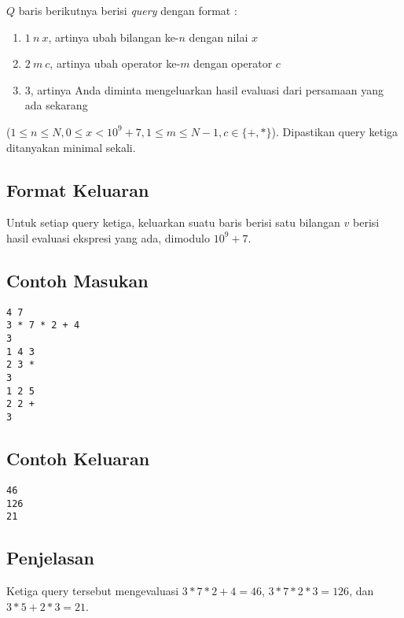 \documentclass{article}
\begin{document}
$Q$ baris berikutnya berisi \textit{query} dengan format :
\begin{enumerate}
    \setlength\itemsep{0pt}
    \item $1\:n\:x$, artinya ubah bilangan ke-$n$ dengan nilai $x$
    \item $2\:m\:c$, artinya ubah operator ke-$m$ dengan operator $c$
    \item $3$, artinya Anda diminta mengeluarkan hasil evaluasi dari persamaan yang ada sekarang
\end{enumerate}
($1 \leq n \leq N, 0 \leq x < 10^9+7, 1 \leq m \leq N-1, c \in \{+,*\}$). Dipastikan query ketiga ditanyakan minimal sekali.

\subsection*{Format Keluaran}

Untuk setiap query ketiga, keluarkan suatu baris berisi satu bilangan $v$ berisi hasil evaluasi ekspresi yang ada, dimodulo $10^9+7$.

\begin{multicols}{2}
\subsection*{Contoh Masukan}
\begin{lstlisting}
4 7
3 * 7 * 2 + 4
3
1 4 3
2 3 *
3
1 2 5
2 2 +
3
\end{lstlisting}
\columnbreak
\subsection*{Contoh Keluaran}
\begin{lstlisting}
46
126
21
\end{lstlisting}
\vfill
\null
\end{multicols}

\subsection*{Penjelasan}
Ketiga query tersebut mengevaluasi $3 * 7 * 2 + 4 = 46$, $3 * 7 * 2 * 3 = 126$, dan $3 * 5 + 2 * 3 = 21$.

\pagebreak
\end{document}

